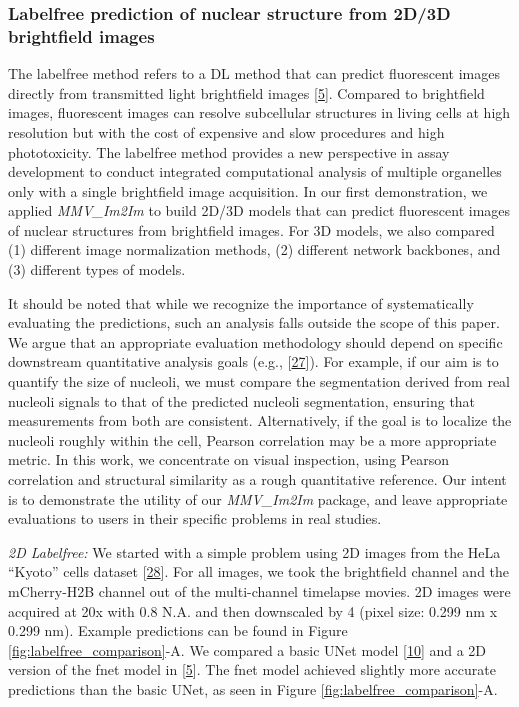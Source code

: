 \hypertarget{labelfree-prediction-of-nuclear-structure-from-2d3d-brightfield-images}{%
\subsubsection{Labelfree prediction of nuclear structure from 2D/3D brightfield images}\label{labelfree-prediction-of-nuclear-structure-from-2d3d-brightfield-images}}

The labelfree method refers to a DL method that can predict fluorescent images directly from transmitted light brightfield images {[}\protect\hyperlink{ref-Yq8wZ6hc}{5}{]}. Compared to brightfield images, fluorescent images can resolve subcellular structures in living cells at high resolution but with the cost of expensive and slow procedures and high phototoxicity. The labelfree method provides a new perspective in assay development to conduct integrated computational analysis of multiple organelles only with a single brightfield image acquisition. In our first demonstration, we applied \emph{MMV\_Im2Im} to build 2D/3D models that can predict fluorescent images of nuclear structures from brightfield images. For 3D models, we also compared (1) different image normalization methods, (2) different network backbones, and (3) different types of models.

It should be noted that while we recognize the importance of systematically evaluating the predictions, such an analysis falls outside the scope of this paper. We argue that an appropriate evaluation methodology should depend on specific downstream quantitative analysis goals (e.g., {[}\protect\hyperlink{ref-C2iqR6xE}{27}{]}). For example, if our aim is to quantify the size of nucleoli, we must compare the segmentation derived from real nucleoli signals to that of the predicted nucleoli segmentation, ensuring that measurements from both are consistent. Alternatively, if the goal is to localize the nucleoli roughly within the cell, Pearson correlation may be a more appropriate metric. In this work, we concentrate on visual inspection, using Pearson correlation and structural similarity as a rough quantitative reference. Our intent is to demonstrate the utility of our \emph{MMV\_Im2Im} package, and leave appropriate evaluations to users in their specific problems in real studies.

\emph{2D Labelfree:} We started with a simple problem using 2D images from the HeLa ``Kyoto'' cells dataset {[}\protect\hyperlink{ref-xv2VIyRP}{28}{]}. For all images, we took the brightfield channel and the mCherry-H2B channel out of the multi-channel timelapse movies. 2D images were acquired at 20x with 0.8 N.A. and then downscaled by 4 (pixel size: 0.299 nm x 0.299 nm). Example predictions can be found in Figure \ref{fig:labelfree_comparison}-A. We compared a basic UNet model {[}\protect\hyperlink{ref-TutLhFSz}{10}{]} and a 2D version of the fnet model in {[}\protect\hyperlink{ref-Yq8wZ6hc}{5}{]}. The fnet model achieved slightly more accurate predictions than the basic UNet, as seen in Figure \ref{fig:labelfree_comparison}-A.

